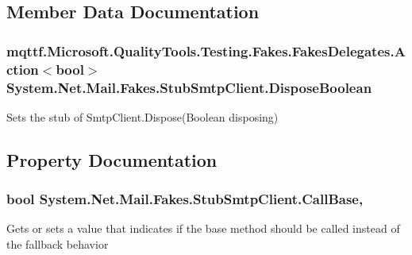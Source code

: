 \subsection{Member Data Documentation}
\hypertarget{class_system_1_1_net_1_1_mail_1_1_fakes_1_1_stub_smtp_client_a4b68aee8229976b9765abcfa3d5519e1}{
\subsubsection[{Dispose\-Boolean}]{\setlength{\rightskip}{0pt plus 5cm}mqttf.\-Microsoft.\-Quality\-Tools.\-Testing.\-Fakes.\-Fakes\-Delegates.\-Action$<$bool$>$ System.\-Net.\-Mail.\-Fakes.\-Stub\-Smtp\-Client.\-Dispose\-Boolean}}\label{class_system_1_1_net_1_1_mail_1_1_fakes_1_1_stub_smtp_client_a4b68aee8229976b9765abcfa3d5519e1}


Sets the stub of Smtp\-Client.\-Dispose(\-Boolean disposing)



\subsection{Property Documentation}
\hypertarget{class_system_1_1_net_1_1_mail_1_1_fakes_1_1_stub_smtp_client_a5f68a049d8a22e9fe23275ab8fa9b8a1}{
\subsubsection[{Call\-Base}]{\setlength{\rightskip}{0pt plus 5cm}bool System.\-Net.\-Mail.\-Fakes.\-Stub\-Smtp\-Client.\-Call\-Base\hspace{0.3cm}{\ttfamily [get]}, {\ttfamily [set]}}}\label{class_system_1_1_net_1_1_mail_1_1_fakes_1_1_stub_smtp_client_a5f68a049d8a22e9fe23275ab8fa9b8a1}


Gets or sets a value that indicates if the base method should be called instead of the fallback behavior

